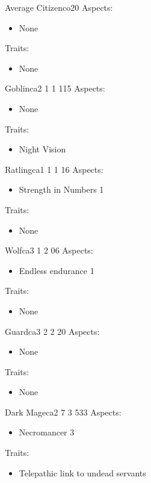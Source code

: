 \documentclass[11pt]{article}
\begin{document}
{\begin{npc}{Average Citizen}{co}{2}{0}
Aspects:
\begin{itemize}
\item None
\end{itemize}
Traits:
\begin{itemize}
\item None
\end{itemize}
\end{npc}

\begin{npc}{Goblin}{ca}{2 1 1 1}{15}
Aspects:
\begin{itemize}
\item None
\end{itemize}
Traits:
\begin{itemize}
\item Night Vision
\end{itemize}
\end{npc}

\begin{npc}{Ratling}{ca}{1 1 1 1}{6}
Aspects:
\begin{itemize}
\item Strength in Numbers 1
\end{itemize}
Traits:
\begin{itemize}
\item None
\end{itemize}
\end{npc}

\begin{npc}{Wolf}{ca}{3 1 2 0}{6}
Aspects:
\begin{itemize}
\item Endless endurance 1
\end{itemize}
Traits:
\begin{itemize}
\item None
\end{itemize}
\end{npc}

\begin{npc}{Guard}{ca}{3 2 2 2}{0}
Aspects:
\begin{itemize}
\item None
\end{itemize}
Traits:
\begin{itemize}
\item None
\end{itemize}
\end{npc}

\begin{npc}{Dark Mage}{ca}{2 7 3 5}{33}
Aspects:
\begin{itemize}
\item Necromancer 3
\end{itemize}
\columnbreak
Traits:
\begin{itemize}
\item Telepathic link to undead servants
\end{itemize}
\end{npc}

}
\end{document}
